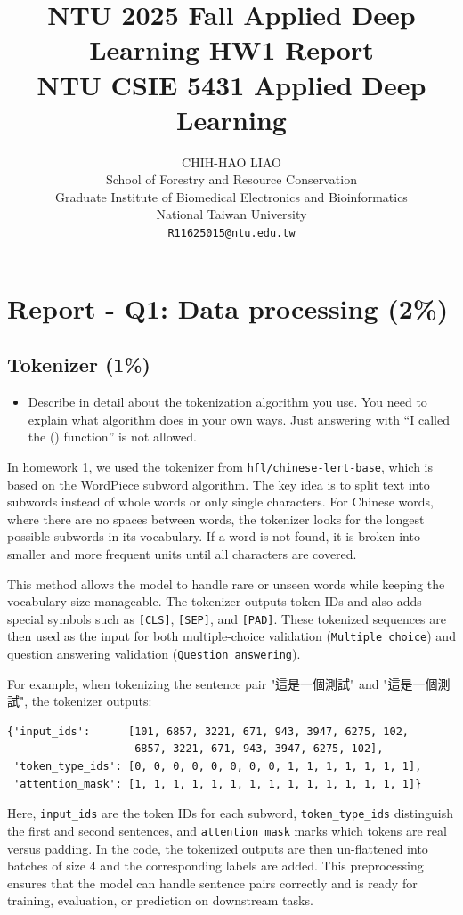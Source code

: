 \documentclass{article}
\title{
  NTU 2025 Fall Applied Deep Learning HW1 Report \\
  \vspace{1em}
  \small{\normalfont NTU CSIE 5431 Applied Deep Learning}
}
\author{
  CHIH-HAO LIAO \\
  School of Forestry and Resource Conservation\\
  Graduate Institute of Biomedical Electronics and Bioinformatics\\
  National Taiwan University\\
  \texttt{R11625015@ntu.edu.tw} \\
}
\begin{document}
\maketitle

\section{Report - Q1: Data processing (2\%)}
\subsection{Tokenizer (1\%)}
\begin{itemize}
    \item Describe in detail about the tokenization algorithm you use. You need to explain what algorithm does in your own ways. Just answering with “I called the () function” is not allowed.
\end{itemize}

In homework 1, we used the tokenizer from \texttt{hfl/chinese-lert-base}, which is based on the WordPiece subword algorithm. The key idea is to split text into subwords instead of whole words or only single characters. For Chinese words, where there are no spaces between words, the tokenizer looks for the longest possible subwords in its vocabulary. If a word is not found, it is broken into smaller and more frequent units until all characters are covered.

This method allows the model to handle rare or unseen words while keeping the vocabulary size manageable. The tokenizer outputs token IDs and also adds special symbols such as \texttt{[CLS]}, \texttt{[SEP]}, and \texttt{[PAD]}. These tokenized sequences are then used as the input for both multiple-choice validation (\texttt{Multiple choice}) and question answering validation (\texttt{Question answering}).

For example, when tokenizing the sentence pair "這是一個測試" and "這是一個測試", the tokenizer outputs:

\begin{verbatim}
{'input_ids':      [101, 6857, 3221, 671, 943, 3947, 6275, 102,
                    6857, 3221, 671, 943, 3947, 6275, 102],
 'token_type_ids': [0, 0, 0, 0, 0, 0, 0, 0, 1, 1, 1, 1, 1, 1, 1],
 'attention_mask': [1, 1, 1, 1, 1, 1, 1, 1, 1, 1, 1, 1, 1, 1, 1]}
\end{verbatim}

Here, \texttt{input\_ids} are the token IDs for each subword, \texttt{token\_type\_ids} distinguish the first and second sentences, and \texttt{attention\_mask} marks which tokens are real versus padding. In the code, the tokenized outputs are then un-flattened into batches of size 4 and the corresponding labels are added. This preprocessing ensures that the model can handle sentence pairs correctly and is ready for training, evaluation, or prediction on downstream tasks.
\end{document}
